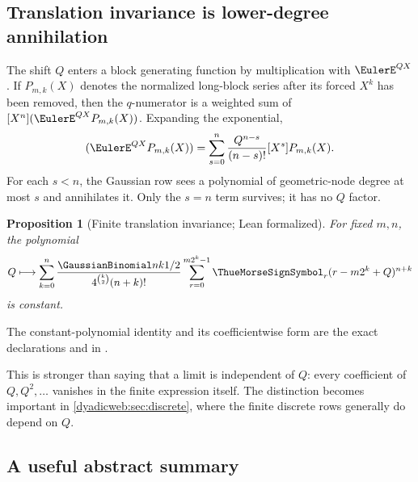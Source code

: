 \documentclass[11pt,oneside]{article}
\newtheorem{proposition}[proposition]{Proposition}
\theoremstyle{definition}
\theoremstyle{remark}
\begin{document}
\subsection{Translation invariance is lower-degree annihilation}

The shift $Q$ enters a block generating function by multiplication with $\EulerE^{QX}$.  If
\(
 P_{m,k}(X)
\)
denotes the normalized long-block series after its forced $X^k$ has been removed, then the
$q$-numerator is a weighted sum of $[X^n](\EulerE^{QX}P_{m,k}(X))$.  Expanding the exponential,
\begin{equation}
 [X^n](\EulerE^{QX}P_{m,k}(X))
 =\sum_{s=0}^{n}\frac{Q^{n-s}}{(n-s)!}[X^s]P_{m,k}(X).     \label{dyadicweb:eq:Q-expansion}
\end{equation}
For each $s<n$, the Gaussian row sees a polynomial of geometric-node degree at most $s$ and
annihilates it.  Only the $s=n$ term survives; it has no $Q$ factor.

\begin{proposition}[Finite translation invariance; Lean formalized]
\label{dyadicweb:prop:finite-Q-invariance}
For fixed $m,n$, the polynomial
\begin{equation}
 Q\longmapsto
 \sum_{k=0}^{n}
 \frac{\GaussianBinomial nk{1/2}}{4^{\binom k2}(n+k)!}
 \sum_{r=0}^{m2^k-1}\ThueMorseSignSymbol_r(r-m2^k+Q)^{n+k}                 \label{dyadicweb:eq:Q-polynomial}
\end{equation}
is constant.
\end{proposition}

The constant-polynomial identity and its coefficientwise form are the exact declarations
 and
 in
.

This is stronger than saying that a limit is independent of $Q$: every coefficient of
$Q,Q^2,\ldots$ vanishes in the finite expression itself.  The distinction becomes important
in \cref{dyadicweb:sec:discrete}, where the finite discrete rows generally do depend on $Q$.

\subsection{A useful abstract summary}
\end{document}
